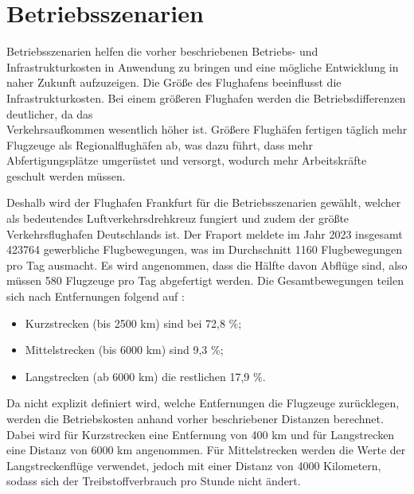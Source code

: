 
\section{Betriebsszenarien}
\label{s:Betriebsszenarien}
Betriebsszenarien helfen die vorher beschriebenen Betriebs- und Infrastrukturkosten 
in Anwendung zu bringen und eine mögliche Entwicklung in naher Zukunft aufzuzeigen. 
Die Größe des Flughafens beeinflusst die Infrastrukturkosten. 
Bei einem größeren Flughafen werden die Betriebsdifferenzen deutlicher, 
da das \\Verkehrsaufkommen wesentlich höher ist.
Größere Flughäfen fertigen täglich mehr Flugzeuge als Regionalflughäfen ab, 
was dazu führt, dass mehr Abfertigungsplätze umgerüstet und versorgt,
wodurch mehr Arbeitskräfte geschult werden müssen.

Deshalb wird der Flughafen Frankfurt für die Betriebsszenarien gewählt,
welcher als bedeutendes Luftverkehrsdrehkreuz fungiert
und zudem der größte Verkehrsflughafen Deutschlands ist.
Der Fraport meldete im Jahr 2023 insgesamt 423764 gewerbliche Flugbewegungen, 
was im Durchschnitt 1160 Flugbewegungen pro Tag ausmacht. 
Es wird angenommen, dass die Hälfte davon Abflüge sind, 
also müssen 580 Flugzeuge pro Tag abgefertigt werden.
%
Die Gesamtbewegungen teilen sich nach Entfernungen folgend auf \cite{fraport2023frankfurt}:
\begin{itemize}
    \item Kurzstrecken (bis 2500 km) sind bei 72,8 \%;
    \item Mittelstrecken (bis 6000 km) sind 9,3 \%;
    \item Langstrecken (ab 6000 km) die restlichen 17,9 \%. 
    \end{itemize}
Da nicht explizit definiert wird, welche Entfernungen die Flugzeuge zurücklegen, 
werden die Betriebskosten anhand vorher beschriebener Distanzen berechnet.
Dabei wird für Kurzstrecken eine Entfernung von 400 km 
und für Langstrecken eine Distanz von 6000 km angenommen.
Für Mittelstrecken werden die Werte der Langstreckenflüge verwendet, 
jedoch mit einer Distanz von 4000 Kilometern, 
sodass sich der Treibstoffverbrauch pro Stunde nicht ändert.

